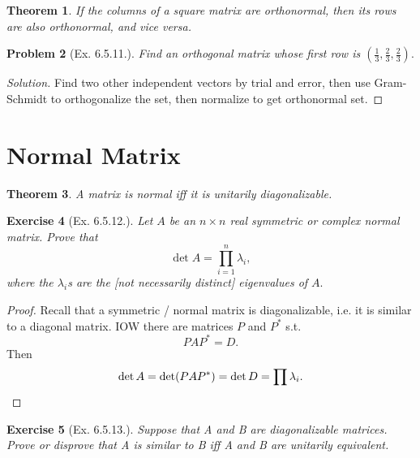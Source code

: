\documentclass[20pt]{extarticle}
\theoremstyle{plain}
\newtheorem{theorem}{Theorem}
\newtheorem{problem}[theorem]{Problem}
\newtheorem{exercise}[theorem]{Exercise}
\theoremstyle{definition}
\theoremstyle{remark}
\newenvironment{solution}{\begin{proof}[Solution]}{\end{proof}}
\newcommand{\0}{\varnothing}
\newcommand{\<}{\langle}
\renewcommand{\>}{\rangle}
\begin{document}
\begin{theorem}
  If the columns of a square matrix are orthonormal, then its rows are also orthonormal, and vice versa.
\end{theorem}

\begin{problem}[Ex. 6.5.11.]
  Find an orthogonal matrix whose first row is \( (\frac{1}{3}, \frac{2}{3}, \frac{2}{3}). \)
\end{problem}

\begin{solution}
  Find two other independent vectors by trial and error, then use Gram-Schmidt to orthogonalize the set, then normalize to get orthonormal set.
\end{solution}

\break
\section*{Normal Matrix}

\begin{theorem}
  A matrix is normal iff it is unitarily diagonalizable.
\end{theorem}

\begin{exercise}[Ex. 6.5.12.]
  Let \( A \) be an \( n \times n \) real symmetric or complex normal matrix. Prove that
  \[
  \det A = \prod_{i=1}^n \lambda_i,
  \]
  where the \( \lambda_i \)s are the [not necessarily distinct] eigenvalues of \( A. \)
\end{exercise}

\begin{proof}
  Recall that a symmetric / normal matrix is diagonalizable, i.e. it is similar to a diagonal matrix. IOW there are matrices \( P \) and \( P^* \) s.t.
  \[
  P A P^* = D.
  \]
  Then
  \[
  \det A = \det (P A P^*) = \det D = \prod \lambda_i. \qedhere
  \]
\end{proof}

\begin{exercise}[Ex. 6.5.13.]
  Suppose that A and B are diagonalizable matrices. Prove or disprove that A is similar to B iff A and B are unitarily equivalent.
\end{exercise}
\end{document}
